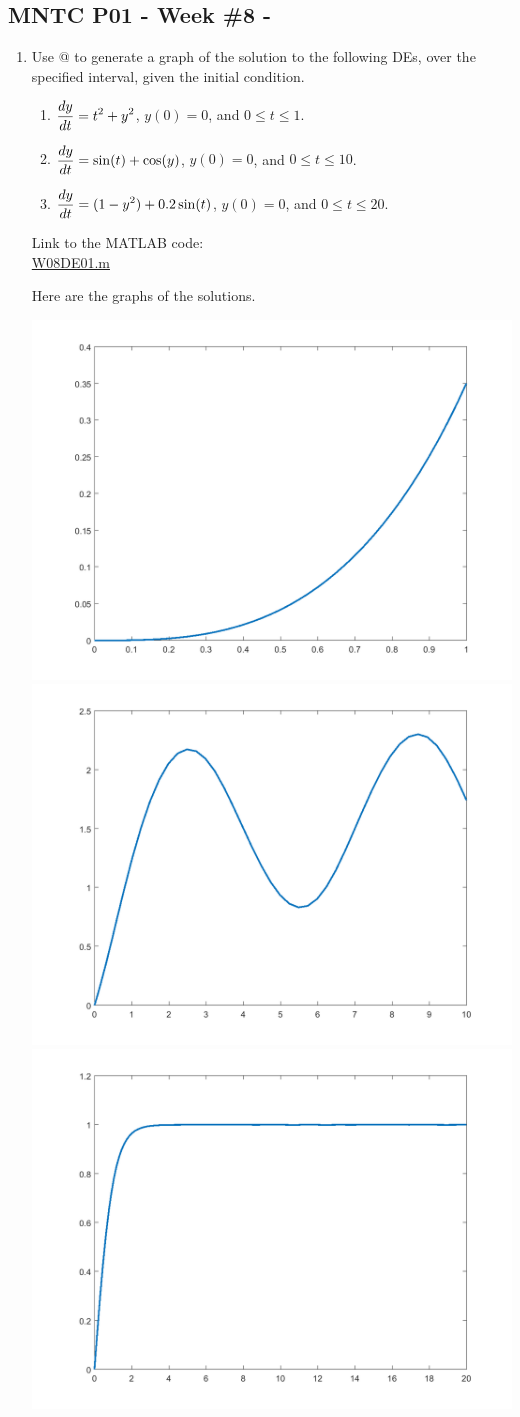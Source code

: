 




\begin{center}
\subsection*{MNTC P01 - Week \#8 - \WeekTitleEight}
\end{center}

\newcommand{\Fext}{  F_{\mbox{ext}} }
\newcommand{\Fspring}{  F_{\mbox{spring}} }
\newcommand{\Fdamping}{  F_{\mbox{damp}} }

\begin{enumerate}

\item 
  \begin{Question}
    Use @ to generate a graph of the solution to the
    following DEs, over the specified interval, given the initial
    condition.

\begin{enumerate}
\item $\displaystyle \frac{dy}{dt} = t^2 + y^2$, $y(0) = 0$, and $0 \le t \le 1$.
\item $\displaystyle \frac{dy}{dt} = \sin(t) + \cos(y)$, $y(0) = 0$, and $0 \le t \le 10$.
\item $\displaystyle \frac{dy}{dt} = (1-y^2) + 0.2 \sin(t)$, $y(0) = 0$, and $0 \le t \le 20$.
\end{enumerate}
\end{Question}

\begin{Solution}
Link to the MATLAB code: \\
\href{http://www.mast.queensu.ca/~apsc171/MNTCP01/PracticeProblems/MATLAB/W08DE01.m}{W08DE01.m}

Here are the graphs of the solutions.

\includegraphics[width = 0.3\linewidth]{graphics/Week08_DESolutions/W08DE01_a} 
\includegraphics[width = 0.3\linewidth]{graphics/Week08_DESolutions/W08DE01_b} 
\includegraphics[width = 0.3\linewidth]{graphics/Week08_DESolutions/W08DE01_c} 


\end{Solution}
\end{enumerate}
